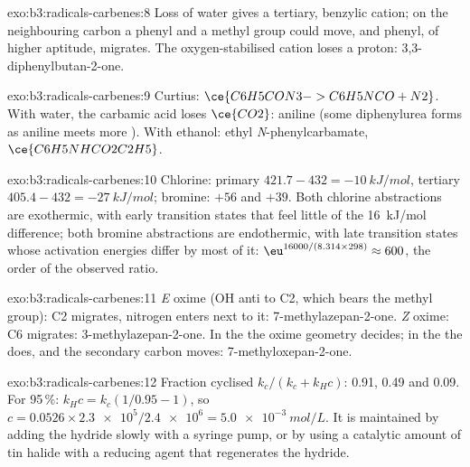 \begin{solution}{exo:b3:radicals-carbenes:8}
Loss of water gives a tertiary, benzylic cation; on the neighbouring carbon a phenyl
and a methyl group could move, and phenyl, of higher aptitude, migrates. The
oxygen-stabilised cation loses a proton: 3,3-diphenylbutan-2-one.
\end{solution}

\begin{solution}{exo:b3:radicals-carbenes:9}
Curtius: $\ce{C6H5CON3 -> C6H5NCO + N2}$. With water, the carbamic acid loses $\ce{CO2}$: aniline
(some diphenylurea forms as aniline meets more ). With ethanol: ethyl
\textit{N}-phenylcarbamate, $\ce{C6H5NHCO2C2H5}$.
\end{solution}

\begin{solution}{exo:b3:radicals-carbenes:10}
Chlorine: primary $421.7 - 432 = \qty{-10}{kJ/mol}$, tertiary $405.4 - 432 = \qty{-27}{kJ/mol}$; bromine: $+56$ and
$+39$. Both chlorine abstractions are exothermic, with early transition states that
feel little of the \qty{16}{kJ/mol} difference; both bromine abstractions are endothermic,
with late transition states whose activation energies differ by most of it:
$\eu^{16000/(8.314 \times 298)} \approx 600$, the order of the observed ratio.
\end{solution}

\begin{solution}{exo:b3:radicals-carbenes:11}
\textit{E} oxime (OH anti to C2, which bears the methyl group): C2 migrates, nitrogen enters
next to it: 7-methylazepan-2-one. \textit{Z} oxime: C6 migrates: 3-methylazepan-2-one. In the
 the oxime geometry decides; in the  the  does, and the secondary carbon moves:
7-methyloxepan-2-one.
\end{solution}

\begin{solution}{exo:b3:radicals-carbenes:12}
Fraction cyclised $k_c/(k_c + k_H c)$: 0.91, 0.49 and 0.09. For 95\,\%: $k_Hc = k_c(1/0.95 - 1)$, so
$c = 0.0526 \times \num{2.3e5}/\num{2.4e6} = \qty{5.0e-3}{mol/L}$. It is maintained by adding the hydride slowly with a
syringe pump, or by using a catalytic amount of tin halide with a reducing agent
that regenerates the hydride.
\end{solution}

